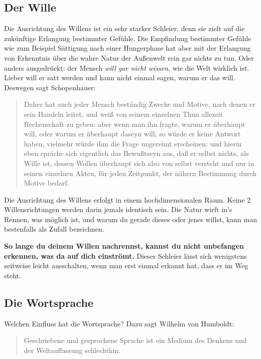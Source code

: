 \documentclass[12pt]{book}
\begin{document}
\subsection{Der Wille}

Die Ausrichtung des Willens ist ein sehr starker Schleier, denn sie zielt auf die zukünftige Erlangung bestimmter Gefühle. Die Empfindung bestimmter Gefühle wie zum Beispiel Sättigung nach einer Hungerphase hat aber mit der Erlangung von Erkenntnis über die wahre Natur der Außenwelt rein gar nichts zu tun. Oder anders ausgedrückt: der Mensch \textit{will gar nicht wissen}, wie die Welt wirklich ist. Lieber will er satt werden und kann nicht einmal sagen, warum er das will. Deswegen sagt Schopenhauer:

\begin{quote}\begin{tcolorbox}
Daher hat auch jeder Mensch beständig Zwecke und Motive, nach denen er sein Handeln leitet, und weiß von seinem einzelnen Thun allezeit Rechenschaft zu geben: aber wenn man ihn fragte, warum er überhaupt will, oder warum er überhaupt daseyn will; so würde er keine Antwort haben, vielmehr würde ihm die Frage ungereimt erscheinen: und hierin eben spräche sich eigentlich das Bewußtseyn aus, daß er selbst nichts, als Wille ist, dessen Wollen überhaupt sich also von selbst versteht und nur in seinen einzelnen Akten, für jeden Zeitpunkt, der nähern Bestimmung durch Motive bedarf.
\end{tcolorbox}\end{quote}

Die Ausrichtung des Willens erfolgt in einem hochdimensionalen Raum. Keine 2 Willensrichtungen werden darin jemals identisch sein. Die Natur wirft in's Rennen, was möglich ist, und warum du gerade dieses oder jenes willst, kann man bestenfalls als Zufall bezeichnen.

\textbf{So lange du deinem Willen nachrennst, kannst du nicht unbefangen erkennen, was da auf dich einströmt.} Dieser Schleier lässt sich wenigstens zeitweise leicht ausschalten, wenn man erst einmal erkannt hat, dass er im Weg steht.

\subsection{Die Wortsprache}

Welchen Einfluss hat die Wortsprache? Dazu sagt Wilhelm von Humboldt:

\begin{quote}\begin{tcolorbox}
Geschriebene und gesprochene Sprache ist ein Medium des Denkens und der Weltauffassung schlechthin.
\end{tcolorbox}\end{quote}
\end{document}
